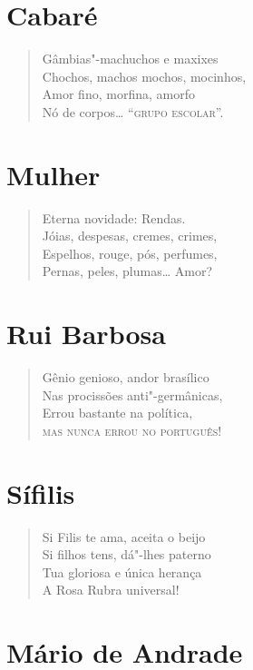 \medskip
\section*{Cabaré}

\begin{verse}
Gâmbias"-machuchos e maxixes\\
Chochos, machos mochos, mocinhos,\\
Amor fino, morfina, amorfo\\
Nó de corpos\ldots{} ``\textsc{grupo escolar}''.
\end{verse}

\medskip
\section*{Mulher}

\begin{verse}
Eterna novidade: Rendas.\\
Jóias, despesas, cremes, crimes,\\
Espelhos, rouge, pós, perfumes,\\
Pernas, peles, plumas\ldots{} Amor?
\end{verse}

\medskip
\section*{Rui Barbosa}

\begin{verse}
Gênio genioso, andor brasílico\\
Nas procissões anti"-germânicas,\\
Errou bastante na política,\\
\textsc{mas nunca errou no português!}
\end{verse}

\medskip
\section*{Sífilis}

\begin{verse}
Si Filis te ama, aceita o beijo\\
Si filhos tens, dá"-lhes paterno\\
Tua gloriosa e única herança\\
A Rosa Rubra universal!
\end{verse}

\medskip
\section*{Mário de Andrade}

